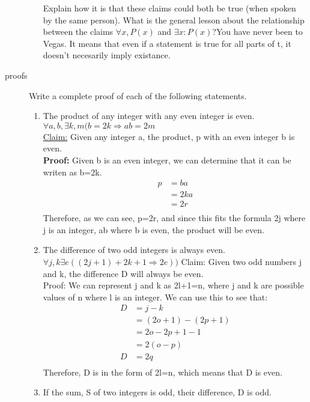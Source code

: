 \documentclass{letter}
\theoremstyle{definition}
\begin{document}
\begin{description}
\begin{enumerate}
			Explain how it is that these claims could both be true (when spoken by the same person). What is the general lesson about the relationship between the claims $\forall x, P(x)$ and $\exists x: P(x)$?You have never been to Vegas. It means that even if a statement is true for all parts of t, it doesn't necesarily imply existance.
\end{enumerate}
\item[proofs] Write a complete proof of each of the following statements.
	\begin{enumerate}
		\item The product of any integer with any even integer is even.
$\forall a, b,\exists k, m(b=2k \Rightarrow ab=2m$ \\
\underline{Claim:} Given any integer a, the product, p with an even integer b is even. \\
\textbf{Proof:} Given b is an even integer, we can determine that it can be writen as b=2k.
\begin{align*}
p &= ba \\
 &= 2ka \tag{Replaces b with 2k} \\
 &= 2r \tag{Uses r to represent ka} \\
\end{align*} 
Therefore, as we can see, p=2r, and since this fits the formula 2j where j is an integer, ab where b is even, the product will be even.
		\item The difference of two odd integers is always even.
$  \forall j, k \exists e((2j+1)+2k+1 \Rightarrow 2e)) $
Claim: Given two odd numbers j and k, the difference D will always be even. \\
Proof: We can represent j and k as 2l+1=n, where j and k are possible values of n where l is an integer. We can use this to see that:
\begin{align*}
D &= j-k \\
&= (2o+1)-(2p+1) \tag{Replaced j with 2o+1 and k with 2p+1} \\
&= 2o-2p+1-1 \tag{distributed negative one} \\
&= 2(o-p) \tag{Subtracted ones and factored out 2.} \\
D &= 2q \tag{rewrote (o-p) as q} \\
\end{align*}
Therefore, D is in the form of 2l=n, which means that D is even. \\
		\item If the sum, S of two integers is odd, their difference, D is odd. \\

\end{enumerate}
\end{description}
\end{document}
